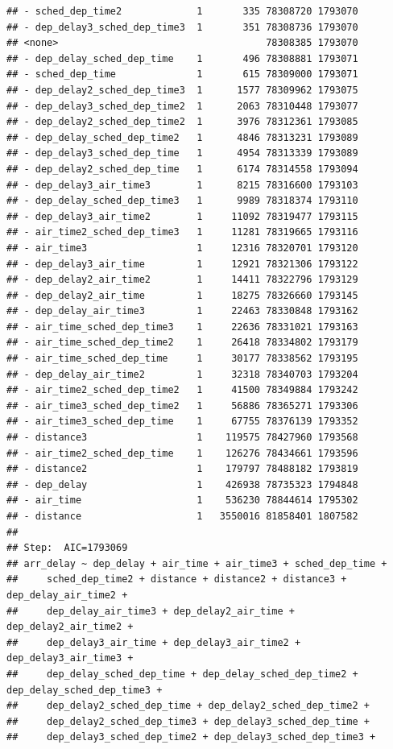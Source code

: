 \documentclass[
]{article}
\begin{document}
\begin{verbatim}
## - sched_dep_time2             1       335 78308720 1793070
## - dep_delay3_sched_dep_time3  1       351 78308736 1793070
## <none>                                    78308385 1793070
## - dep_delay_sched_dep_time    1       496 78308881 1793071
## - sched_dep_time              1       615 78309000 1793071
## - dep_delay2_sched_dep_time3  1      1577 78309962 1793075
## - dep_delay3_sched_dep_time2  1      2063 78310448 1793077
## - dep_delay2_sched_dep_time2  1      3976 78312361 1793085
## - dep_delay_sched_dep_time2   1      4846 78313231 1793089
## - dep_delay3_sched_dep_time   1      4954 78313339 1793089
## - dep_delay2_sched_dep_time   1      6174 78314558 1793094
## - dep_delay3_air_time3        1      8215 78316600 1793103
## - dep_delay_sched_dep_time3   1      9989 78318374 1793110
## - dep_delay3_air_time2        1     11092 78319477 1793115
## - air_time2_sched_dep_time3   1     11281 78319665 1793116
## - air_time3                   1     12316 78320701 1793120
## - dep_delay3_air_time         1     12921 78321306 1793122
## - dep_delay2_air_time2        1     14411 78322796 1793129
## - dep_delay2_air_time         1     18275 78326660 1793145
## - dep_delay_air_time3         1     22463 78330848 1793162
## - air_time_sched_dep_time3    1     22636 78331021 1793163
## - air_time_sched_dep_time2    1     26418 78334802 1793179
## - air_time_sched_dep_time     1     30177 78338562 1793195
## - dep_delay_air_time2         1     32318 78340703 1793204
## - air_time2_sched_dep_time2   1     41500 78349884 1793242
## - air_time3_sched_dep_time2   1     56886 78365271 1793306
## - air_time3_sched_dep_time    1     67755 78376139 1793352
## - distance3                   1    119575 78427960 1793568
## - air_time2_sched_dep_time    1    126276 78434661 1793596
## - distance2                   1    179797 78488182 1793819
## - dep_delay                   1    426938 78735323 1794848
## - air_time                    1    536230 78844614 1795302
## - distance                    1   3550016 81858401 1807582
## 
## Step:  AIC=1793069
## arr_delay ~ dep_delay + air_time + air_time3 + sched_dep_time + 
##     sched_dep_time2 + distance + distance2 + distance3 + dep_delay_air_time2 + 
##     dep_delay_air_time3 + dep_delay2_air_time + dep_delay2_air_time2 + 
##     dep_delay3_air_time + dep_delay3_air_time2 + dep_delay3_air_time3 + 
##     dep_delay_sched_dep_time + dep_delay_sched_dep_time2 + dep_delay_sched_dep_time3 + 
##     dep_delay2_sched_dep_time + dep_delay2_sched_dep_time2 + 
##     dep_delay2_sched_dep_time3 + dep_delay3_sched_dep_time + 
##     dep_delay3_sched_dep_time2 + dep_delay3_sched_dep_time3 + 

\end{verbatim}
\end{document}
